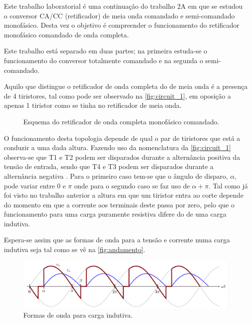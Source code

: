 \documentclass[a4paper,11pt]{article}
\numberwithin{equation}{section}
\begin{document}
Este trabalho laboratorial é uma continuação do trabalho 2A em que se estudou o conversor CA/CC (retificador) de meia onda comandado e semi-comandado monofásico. Desta vez o objetivo é compreender o funcionamento do retificador monofásico comandado de onda completa.

Este trabalho está separado em duas partes; na primeira estuda-se o funcionamento do conversor totalmente comandado e na segunda o semi-comandado.

Aquilo que distingue o retificador de onda completa do de meia onda é a presença de 4 tiristores, tal como pode ser observado na \autoref{fig:circuit_1}, em oposição a apenas 1 tiristor como se tinha no retificador de meia onda.


\begin{figure}[h]
	\centering
	\caption{Esquema do retificador de onda completa monofásico comandado.}
	\label{fig:circuit_1}
	\vspace{-0.8em}
\end{figure}

O funcionamento desta topologia depende de qual o par de tiristores que está a conduzir a uma dada altura. Fazendo uso da nomenclatura da \autoref{fig:circuit_1} observa-se que T1 e T2 podem ser disparados durante a alternância positiva da tensão de entrada, sendo que T4 e T3 podem ser disparados durante a alternância negativa \cite{Silva}. Para o primeiro caso tem-se que o ângulo de disparo, $\alpha$, pode variar entre $0$ e $\pi$ onde para o segundo caso se faz uso de $\alpha + \pi$. Tal como já foi visto no trabalho anterior a altura em que um tiristor entra ao corte depende do momento em que a corrente aos terminais deste passa por zero, pelo que o funcionamento para uma carga puramente resistiva difere do de uma carga indutiva.

Espera-se assim que as formas de onda para a tensão e corrente numa carga indutiva seja tal como se vê na \autoref{fig:andamento}.

\begin{figure}[h]
	\centering
	\includegraphics[keepaspectratio=true, scale=0.8]{img/andamento}
	\caption{Formas de onda para carga indutiva.}
	\label{fig:andamento}
	\vspace{-0.8em}
\end{figure}
\end{document}
